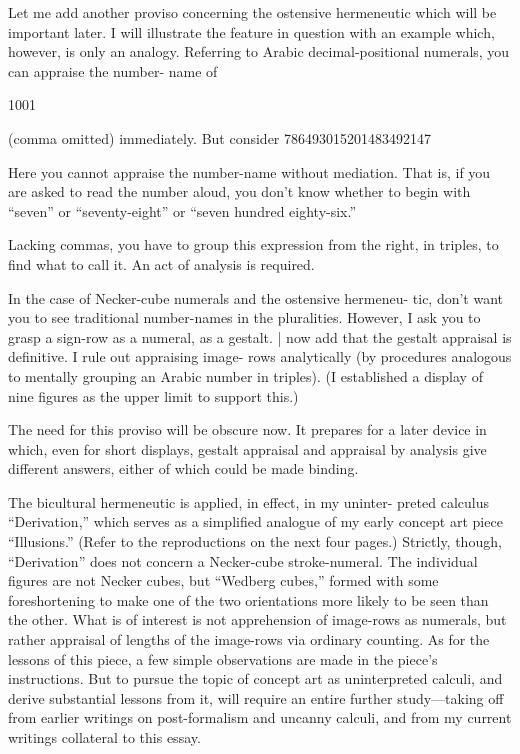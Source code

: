 Let me add another proviso concerning the ostensive hermeneutic 
which will be important later. I will illustrate the feature in question 
with an example which, however, is only an analogy. Referring to 
Arabic decimal-positional numerals, you can appraise the number- 
name of 


1001 


(comma omitted) immediately. But consider 
786493015201483492147 


Here you cannot appraise the number-name without mediation. That 
is, if you are asked to read the number aloud, you don’t know whether 
to begin with “seven” or “seventy-eight” or “seven hundred eighty-six.” 


Lacking commas, you have to group this expression from the right, in 
triples, to find what to call it. An act of analysis is required. 

In the case of Necker-cube numerals and the ostensive hermeneu- 
tic, don’t want you to see traditional number-names in the pluralities. 
However, I ask you to grasp a sign-row as a numeral, as a gestalt. | now 
add that the gestalt appraisal is definitive. I rule out appraising image- 
rows analytically (by procedures analogous to mentally grouping an 
Arabic number in triples). (I established a display of nine figures as the 
upper limit to support this.) 

The need for this proviso will be obscure now. It prepares for a 
later device in which, even for short displays, gestalt appraisal and 
appraisal by analysis give different answers, either of which could be 
made binding. 


The bicultural hermeneutic is applied, in effect, in my uninter- 
preted calculus “Derivation,” which serves as a simplified analogue of 
my early concept art piece “Illusions.” (Refer to the reproductions on 
the next four pages.) Strictly, though, “Derivation” does not concern a 
Necker-cube stroke-numeral. The individual figures are not Necker 
cubes, but “Wedberg cubes,” formed with some foreshortening to make 
one of the two orientations more likely to be seen than the other. What 
is of interest is not apprehension of image-rows as numerals, but rather 
appraisal of lengths of the image-rows via ordinary counting. As for the 
lessons of this piece, a few simple observations are made in the piece’s 
instructions. But to pursue the topic of concept art as uninterpreted 
calculi, and derive substantial lessons from it, will require an entire 
further study—taking off from earlier writings on post-formalism and 
uncanny calculi, and from my current writings collateral to this essay. 


